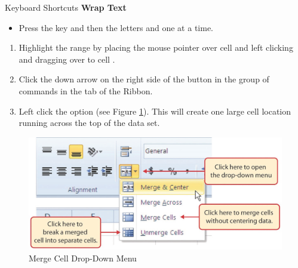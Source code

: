 \begin{center}
	\begin{shtcutbox}{Keyboard Shortcuts}
		\textbf{Wrap Text}
		\\
		\begin{itemize}
			\setlength{\itemsep}{0pt}
			\setlength{\parskip}{0pt}
			\setlength{\parsep}{0pt}
			
			\item Press the  key and then the letters  and  one at a time.
			
		\end{itemize}
	\end{shtcutbox}
\end{center}

\begin{enumerate}[resume]
	\item Highlight the range  by placing the mouse pointer over cell  and left clicking and dragging over to cell .
	\item Click the down arrow on the right side of the  button in the  group of commands in the  tab of the Ribbon.
	\item Left click the  option (see Figure \ref{01:fig39}). This will create one large cell location running across the top of the data set.

\end{enumerate}

\begin{figure}[H]
	\centering
	\includegraphics[width=\maxwidth{.95\linewidth}]{gfx/ch01_fig39}
	\caption{Merge Cell Drop-Down Menu}
	\label{01:fig39}
\end{figure}

